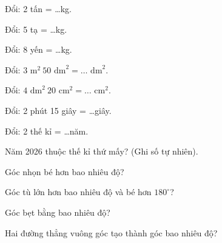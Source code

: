 \begin{ex}
Đổi: 2 tấn = \dots kg.
\end{ex}

\begin{ex}
Đổi: 5 tạ = \dots kg.
\end{ex}

\begin{ex}
Đổi: 8 yến = \dots kg.
\end{ex}

\begin{ex}
Đổi: $3\text{ m}^2\ 50\text{ dm}^2 = \dots\text{ dm}^2$.
\end{ex}

\begin{ex}
Đổi: $4\text{ dm}^2\ 20\text{ cm}^2 = \dots\text{ cm}^2$.
\end{ex}

\begin{ex}
Đổi: 2 phút 15 giây = \dots giây.
\end{ex}

\begin{ex}
Đổi: 2 thế kỉ = \dots năm.
\end{ex}

\begin{ex}
Năm 2026 thuộc thế kỉ thứ mấy? (Ghi số tự nhiên).
\end{ex}

\begin{ex}
Góc nhọn bé hơn bao nhiêu độ?
\end{ex}

\begin{ex}
Góc tù lớn hơn bao nhiêu độ và bé hơn $180^\circ$?
\end{ex}

\begin{ex}
Góc bẹt bằng bao nhiêu độ?
\end{ex}

\begin{ex}
Hai đường thẳng vuông góc tạo thành góc bao nhiêu độ?
\end{ex}

